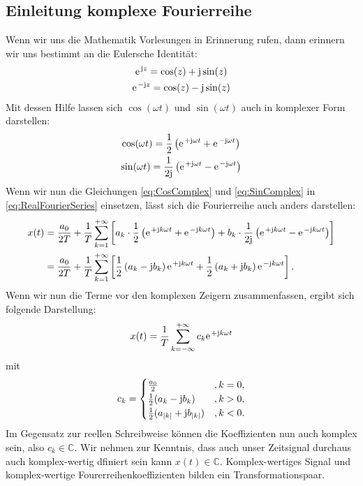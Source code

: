 \documentclass[11pt,a4paper,DIV=12]{scrartcl}
\begin{document}
\subsection{Einleitung komplexe Fourierreihe}
%
Wenn wir uns die Mathematik Vorlesungen in Erinnerung rufen, dann erinnern wir
uns bestimmt an die Eulersche Identität:
%
\begin{gather}
	\label{eq:EulerIdentity}
	\e^{\im z}=\cos(z)+\im\sin(z)\\
	\label{eq:ConjugatedEulerIdenity}
	\e^{-\im z}=\cos(z)-\im\sin(z)
\end{gather}
%
Mit dessen Hilfe lassen sich $\cos(\omega t)$ und $\sin(\omega t)$ auch in komplexer Form darstellen:
%
\begin{gather}
	\label{eq:CosComplex}
	\cos(\omega t)=\frac{1}{2}\left (\e^{+\im\omega t}+\e^{-\im\omega t}\right)\\
	\label{eq:SinComplex}
	\sin(\omega t)=\frac{1}{2\im}\left (\e^{+\im\omega t}-\e^{-\im\omega t}\right )
\end{gather}
%
Wenn wir nun die Gleichungen \eqref{eq:CosComplex} und \eqref{eq:SinComplex} in
\eqref{eq:RealFourierSeries} einsetzen, lässt sich die Fourierreihe auch anders
darstellen:
%
\begin{align}
	x(t)
	&=\frac{a_0}{2T}+\frac{1}{T}\sum_{k=1}^{+\infty}\left [a_k\cdot\frac{1}{2}\left (\e^{+\im k \omega t}+\e^{-\im k \omega t}\right)+b_k\cdot\frac{1}{2\im}\left (\e^{+\im k \omega t}-\e^{-\im k \omega t}\right )\right ]\\
	&=\frac{a_0}{2T}+\frac{1}{T}\sum_{k=1}^{+\infty}\left [\frac{1}{2}\left(a_k-\im b_k\right)\e^{+\im k \omega t}+\frac{1}{2}\left(a_k+\im b_k\right)\e^{-\im k \omega t}\right ].
\end{align}
%
Wenn wir nun die Terme vor den komplexen Zeigern zusammenfassen, ergibt sich folgende Darstellung:
%
\begin{align}
	x(t)=\frac{1}{T}\sum_{k=-\infty}^{+\infty}c_k\e^{+\im k \omega t}
\end{align}
%
mit
%
\begin{align}
	\label{eq:ComplexRealCoeffConnection}
	c_k=
		\begin{cases}
			\frac{a_0}{2} &,k=0 ,\\
			\frac{1}{2}(a_k-\im b_k) &,k>0,\\
			\frac{1}{2}(a_{|k|}+\im b_{|k|}) &,k<0.
		\end{cases}
\end{align}
%
Im Gegensatz zur reellen Schreibweise können die Koeffizienten nun auch komplex
sein, also $c_k\in\mathbb{C}$.
%
Wir nehmen zur Kenntnis, dass auch unser Zeitsignal durchaus auch
komplex-wertig dfiniert sein kann $x(t)\in\mathbb{C}$.
%
Komplex-wertiges Signal und komplex-wertige Fourerreihenkoeffizienten bilden
ein Transformationspaar.
\end{document}
